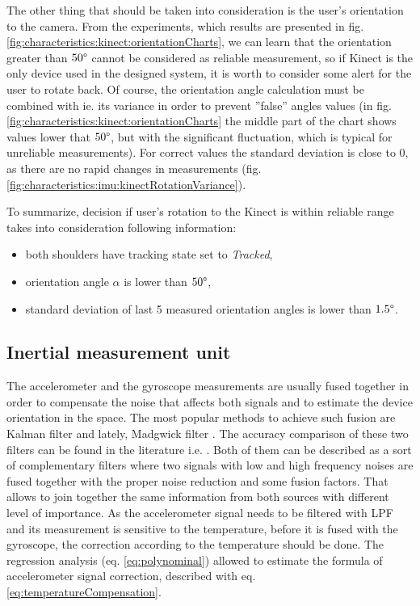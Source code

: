 \documentclass{llncs}
\begin{document}
The other thing that should be taken into consideration is the user's orientation to the camera. From the experiments, which results are presented in fig. \ref{fig:characteristics:kinect:orientationCharts}, we can learn that the orientation greater than $50\degree$ cannot be considered as reliable measurement, so if Kinect is the only device used in the designed system, it is worth to consider some alert for the user to rotate back. Of course, the orientation angle calculation must be combined with ie. its variance in order to prevent ''false'' angles values (in fig. \ref{fig:characteristics:kinect:orientationCharts} the middle part of the chart shows values lower that $50\degree$, but with the significant fluctuation, which is typical for unreliable measurements). For correct values the standard deviation is close to 0, as there are no rapid changes in measurements (fig. \ref{fig:characteristics:imu:kinectRotationVariance}).

To summarize, decision if user's rotation to the Kinect is within reliable range takes into consideration following information:
\begin{itemize}
	\item both shoulders have tracking state set to \textsl{Tracked},
	\item orientation angle $\alpha$ is lower than $50\degree$,
	\item standard deviation of last 5 measured orientation angles is lower than $1.5\degree$.
\end{itemize}

\subsection{Inertial measurement unit}
The accelerometer and the gyroscope measurements are usually fused together in order to compensate the noise that affects both signals and to estimate the device orientation in the space. The most popular methods to achieve such fusion are Kalman filter \cite{Mccarron2013,Caron2006} and lately, Madgwick filter \cite{Kalkbrenner2014}. The accuracy comparison of these two filters can be found in the literature i.e. \cite{Madgwick2010}. Both of them can be described as a sort of complementary filters where two signals with low and high frequency noises are fused together with the proper noise reduction and some fusion factors. That allows to join together the same information from both sources with different level of importance. As the accelerometer signal needs to be filtered with LPF and its measurement is sensitive to the temperature, before it is fused with the gyroscope, the correction according to the temperature should be done. The regression analysis (eq. \eqref{eq:polynominal}) allowed to estimate the formula of accelerometer signal correction, described with eq. \eqref{eq:temperatureCompensation}. 
\end{document}
